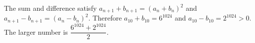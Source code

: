 The sum and difference satisfy $a_{n+1}+b_{n+1}=(a_n+b_n)^2$ and $a_{n+1}-b_{n+1}=(a_n-b_n)^2$. Therefore $a_{10}+b_{10}=6^{1024}$ and $a_{10}-b_{10}=2^{1024}>0$. The larger number is $\boxed{\dfrac{6^{1024}+2^{1024}}{2}}$.
